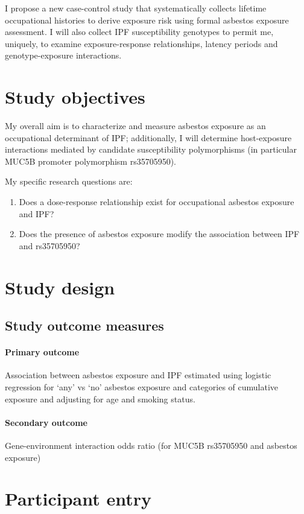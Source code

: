 \documentclass[a4paper,10pt]{article}
\begin{document}
I propose a new case-control study that systematically collects lifetime occupational histories to derive exposure risk using formal asbestos exposure assessment. I will also collect IPF susceptibility genotypes to permit me, uniquely, to examine exposure-response relationships, latency periods and genotype-exposure interactions. 

\section{Study objectives}
My overall aim is to characterize and measure asbestos exposure as an occupational determinant of IPF; additionally, I will determine host-exposure interactions mediated by candidate susceptibility polymorphisms (in particular MUC5B promoter polymorphism rs35705950). 

My specific research questions are:
\begin{enumerate}
 \item Does a dose-response relationship exist for occupational asbestos exposure and IPF? 
 \item Does the presence of asbestos exposure modify the association between IPF and rs35705950? 
\end{enumerate}

\section{Study design}
\subsection{Study outcome measures}
\paragraph{Primary outcome}
Association between asbestos exposure and IPF estimated using logistic regression for ‘any’ vs ‘no’ asbestos exposure and categories of cumulative exposure and adjusting for age and smoking status.

\paragraph{Secondary outcome}
Gene-environment interaction odds ratio (for MUC5B rs35705950 and asbestos exposure)

\section{Participant entry}
\end{document}
